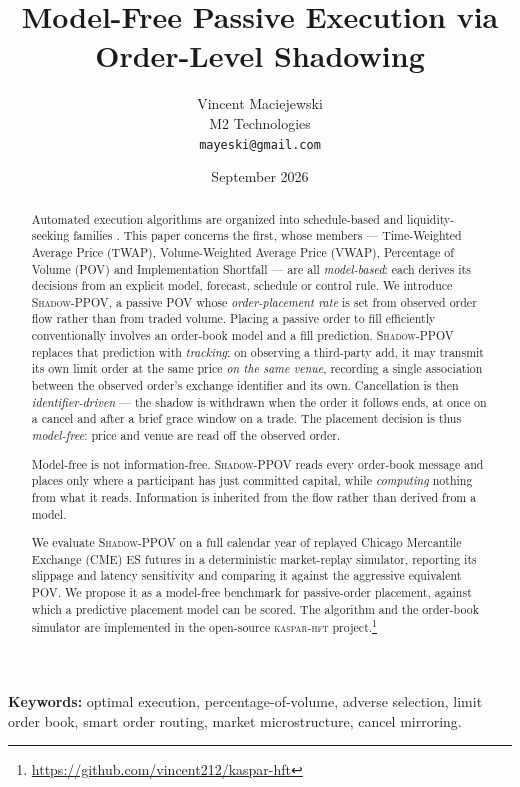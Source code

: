 \documentclass[11pt]{article}
\title{\textbf{Model-Free Passive Execution via Order-Level Shadowing}}
\author{%
  Vincent Maciejewski\\
  \small M2 Technologies\\
  \small \texttt{mayeski@gmail.com}
}
\date{September 2026}
\newcommand{\pov}{\textsc{Shadow-PPOV}}
\begin{document}
\maketitle

\begin{abstract}
Automated execution algorithms are organized into schedule-based and
liquidity-seeking families \cite{johnson2010,bayesiantca2019}. This paper
concerns the first, whose members --- Time-Weighted Average Price (TWAP),
Volume-Weighted Average Price (VWAP), Percentage of Volume (POV) and
Implementation Shortfall --- are all \emph{model-based}: each derives its
decisions from an explicit model, forecast, schedule or control rule. We introduce \pov{}, a passive POV
whose \emph{order-placement rate} is set from observed order flow rather than
from traded volume. Placing a passive order to fill efficiently conventionally
involves an order-book model and a fill prediction.
\pov{} replaces that prediction with \emph{tracking}: on observing a
third-party add, it may transmit its own limit order at the same price
\emph{on the same venue}, recording a single association between the observed
order's exchange identifier and its own. Cancellation is then
\emph{identifier-driven} --- the shadow is withdrawn when the order it follows
ends, at once on a cancel and after a brief grace window on a trade. The placement decision is thus \emph{model-free}: price
and venue are read off the observed order.

Model-free is not information-free. \pov{} reads every order-book message and
places only where a participant has just committed capital, while
\emph{computing} nothing from what it reads. Information is inherited from the
flow rather than derived from a model.

We evaluate \pov{} on a full calendar year of replayed Chicago Mercantile
Exchange (CME) ES futures in a deterministic market-replay simulator, reporting
its slippage and latency sensitivity and comparing it against the aggressive
equivalent POV. We propose it as a model-free benchmark for passive-order
placement, against which a predictive placement model can be scored. The
algorithm and the order-book simulator are implemented in the open-source
\textsc{kaspar-hft} project.\footnote{\url{https://github.com/vincent212/kaspar-hft}}
\end{abstract}

\vspace{0.5em}
\noindent\textbf{Keywords:} optimal execution, percentage-of-volume, adverse
selection, limit order book, smart order routing, market microstructure,
cancel mirroring.
\end{document}
